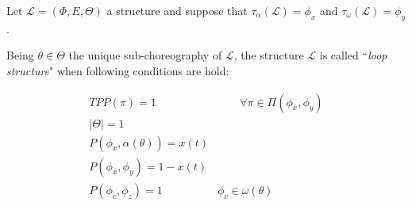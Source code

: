 \documentclass[12pt,a4paper]{report}
\begin{document}
Let $\mathcal{L} = (\Phi,E,\Theta)$ a structure and suppose that $\tau_{\alpha}(\mathcal{L}) = \phi_{x}$ and $\tau_{\omega} (\mathcal{L}) = \phi_{y}$. 

Being $\theta \in \Theta$ the unique sub-choreography of $\mathcal{L}$, the structure $\mathcal{L}$ is called ``\textit{loop structure}" when following conditions are hold:

\begin{eqnarray}
	TPP(\pi) = 1 & \qquad \forall \pi \in \Pi(\phi_{x}, \phi_{y}) \\
	|\Theta| = 1  &  \\
	P(\phi_{x}, \alpha(\theta)) = x(t) & \\
	P(\phi_{x}, \phi_{y}) = 1 - x(t) & \\
	P(\phi_{c}, \phi_{z}) = 1 & \phi_{c} \in \omega(\theta)\\
\end{eqnarray}
\end{document}
